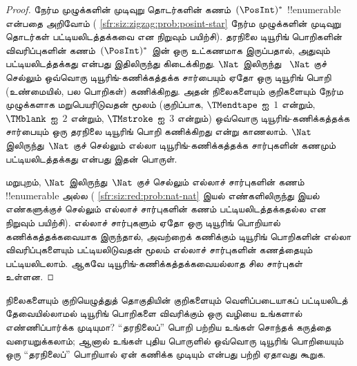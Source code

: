 \documentclass[../../../include/open-logic-section]{subfiles}
\begin{document}
\begin{proof}
நேர்ம முழுக்களின் முடிவுறு தொடர்களின் கணம்~$(\PosInt)^*$
!!{enumerable} என்பதை அறிவோம்
(
  {\cref{sfr:siz:zigzag:prob:posint-star}}
  {நேர்ம முழுக்களின் முடிவுறு தொடர்கள் பட்டியலிடத்தக்கவை என நிறுவும் பயிற்சி}).
தரநிலை டியூரிங் பொறிகளின்
விவரிப்புகளின் கணம்~$(\PosInt)^*$ இன் ஒரு உட்கணமாக இருப்பதால், அதுவும்
பட்டியலிடத்தக்கது என்பது இதிலிருந்து கிடைக்கிறது. $\Nat$ இலிருந்து
~$\Nat$ குச் செல்லும் ஒவ்வொரு டியூரிங்-கணிக்கத்தக்க சார்பையும் ஏதோ
ஒரு டியூரிங் பொறி (உண்மையில், பல பொறிகள்) கணிக்கிறது. அதன் நிலைகளையும்
குறிகளையும் நேர்ம முழுக்களாக மறுபெயரிடுவதன் மூலம் (குறிப்பாக,
$\TMendtape$ ஐ~$1$ என்றும், $\TMblank$ ஐ~$2$ என்றும், $\TMstroke$
ஐ~$3$ என்றும்) ஒவ்வொரு டியூரிங்-கணிக்கத்தக்க சார்பையும் ஒரு தரநிலை
டியூரிங் பொறி கணிக்கிறது என்று காணலாம். $\Nat$ இலிருந்து~$\Nat$ குச்
செல்லும் எல்லா டியூரிங்-கணிக்கத்தக்க சார்புகளின் கணமும்
பட்டியலிடத்தக்கது என்பது இதன் பொருள்.

மறுபுறம், $\Nat$ இலிருந்து~$\Nat$ குச் செல்லும் எல்லாச் சார்புகளின்
கணம் !!{enumerable} அல்ல
(
  {\cref{sfr:siz:red:prob:nat-nat}}
  {இயல் எண்களிலிருந்து இயல் எண்களுக்குச் செல்லும் எல்லாச் சார்புகளின் கணம் பட்டியலிடத்தக்கதல்ல என நிறுவும் பயிற்சி}).
எல்லாச்
சார்புகளும் ஏதோ ஒரு டியூரிங் பொறியால் கணிக்கத்தக்கவையாக இருந்தால்,
அவற்றைக் கணிக்கும் டியூரிங் பொறிகளின் எல்லா விவரிப்புகளையும்
பட்டியலிடுவதன் மூலம் எல்லாச் சார்புகளின் கணத்தையும் பட்டியலிடலாம்.
ஆகவே டியூரிங்-கணிக்கத்தக்கவையல்லாத சில சார்புகள் உள்ளன.
\end{proof}

\begin{prob}
  நிலைகளையும் குறியெழுத்துத் தொகுதியின் குறிகளையும் வெளிப்படையாகப்
  பட்டியலிடத் தேவையில்லாமல் டியூரிங் பொறிகளை விவரிக்கும் ஒரு வழியை
  உங்களால் எண்ணிப்பார்க்க முடியுமா? ``தரநிலைப்'' பொறி பற்றிய உங்கள்
  சொந்தக் கருத்தை வரையறுக்கலாம்; ஆனால் உங்கள் புதிய பொருளில் ஒவ்வொரு
  டியூரிங் பொறியையும் ஒரு ``தரநிலைப்'' பொறியால் ஏன் கணிக்க முடியும்
  என்பது பற்றி ஏதாவது கூறுக.
\end{prob}
\end{document}
